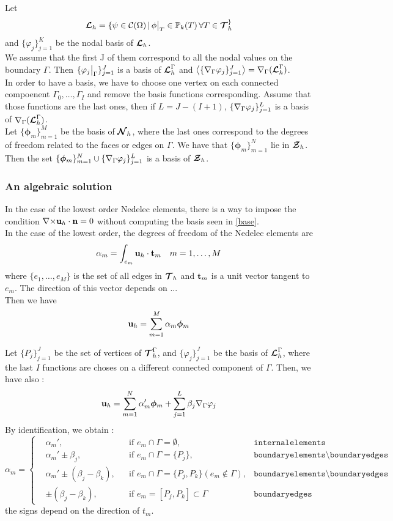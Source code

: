 Let \[ {\bm{\mathcal{L}}}_h=\{\psi\in\mathcal{C}(\Omega) \,|\,
\phi{\big\rvert_{T}}\in{\mathbb{P}}_k(T)\,\forall T\in{\bm{\mathcal{T}}}_h^\} \]
and $\{\varphi_j\}_{j=1}^K$ be the nodal basis of ${\bm{\mathcal{L}}}_h$.\\
We assume that the first J of them correspond to all the nodal values on the
boundary $\Gamma$. Then $\{\varphi_j{\big\rvert_{\Gamma}}\}_{j=1}^J$ is a
basis of ${\bm{\mathcal{L}}}_h^\Gamma$ and
$\left\langle\{{\nabla}_\Gamma\varphi_j\}_{j=1}^J\right\rangle={\nabla}_\Gamma({\bm{\mathcal{L}}}_h^\Gamma)$.\\
In order to have a basis, we have to choose one vertex on each connected
compoenent $\Gamma_0,\dots,\Gamma_I$ and remove the basis functions
corresponding. Assume that those functions are the last ones, then if
$L=J-(I+1)$, $\{{\nabla}_\Gamma\varphi_j\}_{j=1}^L$ is a basis of
${\nabla}_\Gamma({\bm{\mathcal{L}}}_h^\Gamma)$.\\
Let $\{\bm{\phi}_m\}_{m=1}^M$ be the basis of ${\bm{\mathcal{N}}}_h$, where the last ones
correspond to the degrees of freedom related to the faces or edges on
$\Gamma$. We have that $\{\bm{\phi}_m\}_{m=1}^N$ lie in ${\bm{\mathcal{Z}}}_h$.\\

Then the set $\{\bm{\phi}_m\}_{m=1}^N\cup  \{{\nabla}_\Gamma\varphi_j\}_{j=1}^L$
is a basis of ${\bm{\mathcal{Z}}}_h$.

\subsubsection{An algebraic solution}
In the case of the lowest order Nedelec elements, there is a way to impose the
condition ${\nabla\times}{\mathbf{u}}_h\cdot{\mathbf{n}}=0$ without computing the basis seen in
  \ref{base}.\\
In the case of the lowest order, the degrees of freedom of the Nedelec elements
are \[\alpha_m=\int_{e_m} {\mathbf{u}}_h\cdot{\mathbf{t}}_m \quad m=1,\dots,M\] where $\{e_1,\dots,e_M\}$ is the set
of all edges in ${\bm{\mathcal{T}}}_h$ and ${\mathbf{t}}_m$ is a unit vector tangent to $e_m$. The
direction of this vector depends on ...\\
Then we have \[{\mathbf{u}}_h = \sum_{m=1}^M \alpha_m\bm{\phi}_m\]

Let $\{P_j\}_{j=1}^J$ be the set of vertices of ${\bm{\mathcal{T}}}_h^\Gamma$, and
$\{\varphi_j\}_{j=1}^J$ be the basis of ${\bm{\mathcal{L}}}_h^\Gamma$, where the last $I$
functions are choses on a different connected component of $\Gamma$. Then, we have also :
\[ {\mathbf{u}}_h = \sum_{m=1}^N \alpha_m'\bm{\phi}_m + \sum_{j=1}^L
\beta_j{\nabla}_\Gamma\varphi_j \]
By identification, we obtain :
\[
\alpha_m=\left\{\begin{aligned}
&\alpha_m', &&\mbox{if } e_m\cap\Gamma = \emptyset, &\texttt{internalelements}\\
&\alpha_m'\pm \beta_j, &&\mbox{if } e_m\cap\Gamma = \{P_j\},& \texttt{boundaryelements}\setminus\texttt{boundaryedges}\\
&\alpha_m'\pm (\beta_j-\beta_k), &&\mbox{if } e_m\cap\Gamma = \{P_j,P_k\}
(e_m\notin\Gamma),& \texttt{boundaryelements}\setminus\texttt{boundaryedges}\\
&\pm (\beta_j-\beta_k), &&\mbox{if } e_m=[P_j,P_k]\subset\Gamma & \texttt{boundaryedges}
\end{aligned}\right.
\]
the signs depend on the direction of $t_m$.\\

